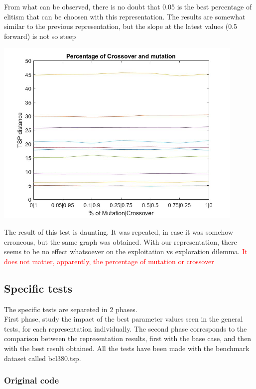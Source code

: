 From what can be observed, there is no doubt that 0.05 is the best
percentage of elitism that can be choosen with this representation. The results
are somewhat similar to the previous representation, but the slope at the
latest values (0.5 forward) is not so steep

\begin{center}
\includegraphics[width=12cm]{img/order_crossover/crossMut.jpg}
\end{center}

The result of this test is daunting. It was repeated, in case it was somehow
erroneous, but the same graph was obtained. With our representation, there
seems to be no effect whatsoever on the exploitation vs exploration dilemma.
\textcolor{red}{It does not matter, apparently, the percentage of mutation
or crossover}
\\


\subsection{Specific tests}

The specific tests are separeted in 2 phases.\\
 First phase, study the impact of the best parameter values seen in the general
tests, for each representation individually. The second phase
corresponds to the comparison between the representation results, first with the
base case, and then with the best result obtained.
All the tests have been made with the benchmark dataset called bcl380.tsp.

\subsubsection{Original code}

